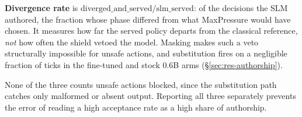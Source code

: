 \textbf{Divergence rate} is
$\mathrm{diverged\_and\_served}/\allowbreak\mathrm{slm\_served}$: of the
decisions the SLM authored, the fraction whose phase differed from what
MaxPressure would have chosen. It measures how far the served policy
departs from the classical reference, \emph{not} how often the shield
vetoed the model. Masking makes such a veto structurally impossible for
unsafe actions, and substitution fires on a negligible fraction of ticks in
the fine-tuned and stock 0.6B arms (\S\ref{sec:res-authorship}).

None of the three counts unsafe actions blocked, since the substitution
path catches only malformed or absent output. Reporting all three
separately prevents the error of reading a high acceptance rate as a high
share of authorship.
